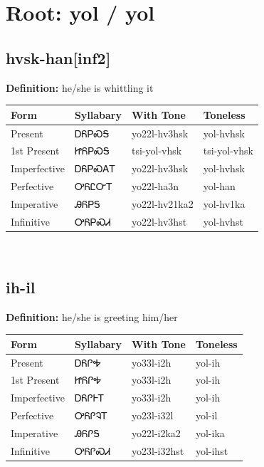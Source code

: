 \documentclass{article}%
\begin{document}
%
\normalsize%
\section*{Root: yol / yol}%
\subsection*{hvsk-han[inf2]}%
\textbf{Definition: }%
he/she is whittling it%
\\[0.5em]%
\begin{tabular}{|l|l|l|l|}%
\hline%
\textbf{Form}&\textbf{Syllabary}&\textbf{With Tone}&\textbf{Toneless}\\%
\hline%
Present&ᎠᏲᏢᏍᎦ&yo22l{-}hv3hsk&yol{-}hvhsk\\%
1st Present&ᏥᏲᏢᏍᎦ&tsi{-}yol{-}vhsk&tsi{-}yol{-}vhsk\\%
Imperfective&ᎠᏲᏢᏍᎪᎢ&yo22l{-}hv3hsk&yol{-}hvhsk\\%
Perfective&ᎤᏲᏝᏅᎢ&yo22l{-}ha3n&yol{-}han\\%
Imperative&ᎯᏲᏢᎦ&yo22l{-}hv21ka2&yol{-}hv1ka\\%
Infinitive&ᎤᏲᏢᏍᏗ&yo22l{-}hv3hst&yol{-}hvhst\\%
\hline%
\end{tabular}%
\\[1em]%
\subsection*{ih-il}%
\textbf{Definition: }%
he/she is greeting him/her%
\\[0.5em]%
\begin{tabular}{|l|l|l|l|}%
\hline%
\textbf{Form}&\textbf{Syllabary}&\textbf{With Tone}&\textbf{Toneless}\\%
\hline%
Present&ᎠᏲᎵᎭ&yo33l{-}i2h&yol{-}ih\\%
1st Present&ᏥᏲᎵᎭ&yo33l{-}i2h&yol{-}ih\\%
Imperfective&ᎠᏲᎵᎰᎢ&yo33l{-}i2h&yol{-}ih\\%
Perfective&ᎤᏲᎵᎸᎢ&yo23l{-}i32l&yol{-}il\\%
Imperative&ᎯᏲᎵᎦ&yo22l{-}i2ka2&yol{-}ika\\%
Infinitive&ᎤᏲᎵᏍᏗ&yo23l{-}i32hst&yol{-}ihst\\%
\hline%
\end{tabular}%
\\[1em]%
\end{document}

